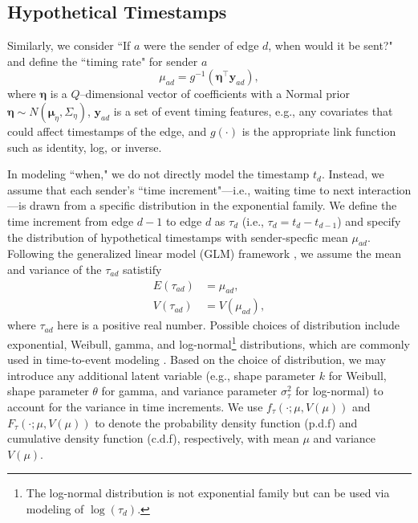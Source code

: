 \documentclass[ba]{imsart}
\numberwithin{equation}{section}
\theoremstyle{plain}
\begin{document}
\subsection{Hypothetical Timestamps}\label{subsec:Time}
Similarly, we consider ``If $a$ were the sender of edge $d$, when would it be sent?" and define the ``timing rate" for sender $a$
\begin{equation}
\mu_{ad} = g^{-1}(\boldsymbol{\eta}^\top \boldsymbol{y}_{ad}),
\end{equation}
where $\boldsymbol{\eta}$ is a $Q$--dimensional vector of coefficients with a Normal prior $\boldsymbol{\eta} \sim N(\boldsymbol{\mu}_\eta,\Sigma_\eta)$, $\boldsymbol{y}_{ad}$ is a set of event timing features, e.g., any covariates that could affect timestamps of the edge, and $g(\cdot)$ is the appropriate link function such as identity, log, or inverse. 

In modeling ``when," we do not directly model the timestamp $t_d$. Instead, we assume that each sender's ``time increment"---i.e., waiting time to next interaction---is drawn from a specific distribution in the exponential family. We define the time increment from edge $d-1$ to edge $d$ as $\tau_{d}$ (i.e., $\tau_{d}= t_d-t_{d-1}$) and specify the distribution of hypothetical timestamps with sender-specfic mean $\mu_{ad}$. Following the generalized linear model (GLM) framework \citep{nelder1972generalized}, we assume the mean and variance of the $\tau_{ad}$ satistify
\begin{equation}
\begin{aligned}
E(\tau_{ad}) &= \mu_{ad},\\
V(\tau_{ad}) &= V(\mu_{ad}),
\end{aligned}
\end{equation}
where $\tau_{ad}$ here is a positive real number. Possible choices of distribution include exponential, Weibull, gamma, and log-normal\footnote{The log-normal distribution is not exponential family but can be used via modeling of $\log(\tau_d)$.} distributions, which are commonly used in time-to-event modeling \citep{rao2000applied,rizopoulos2012joint}. Based on the choice of distribution, we may introduce any additional latent variable (e.g., shape parameter $k$ for Weibull, shape parameter $\theta$ for gamma, and variance parameter $\sigma_\tau^2$ for log-normal) to account for the variance in time increments. We use $f_\tau(\cdot; \mu, V(\mu))$ and $F_\tau(\cdot; \mu, V(\mu))$ to denote the probability density function (p.d.f) and cumulative density function (c.d.f), respectively, with mean $\mu$ and variance $V(\mu)$.
\end{document}
